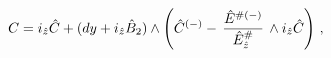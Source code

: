 \begin{equation}
\label{rC=-r1} 
C= i_{\hat{z}}\hat{C} + (dy +i_{\hat{z}} \hat{B}_2) \wedge 
\left(\hat{C}^{(-)} -  \,
{\hat{E}^{ {\#}(-)}\over \hat{E}_{\hat{z}}^{ {\#}}}\, 
\wedge 
i_{\hat{z}} \hat{C} \right)\, ,
\end{equation}


